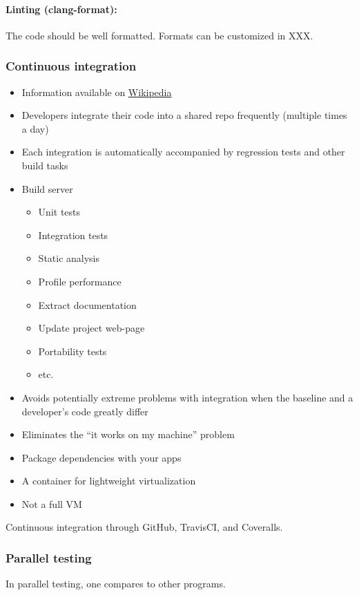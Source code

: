 \documentclass[12pt, titlepage]{article}
\begin{document}
\paragraph{Linting (clang-format):}
The code should be well formatted. Formats can be customized in XXX.

\subsubsection{Continuous integration}
\begin{itemize}
\item Information available on
  \href{https://en.wikipedia.org/wiki/Continuous_integration}{Wikipedia}
\item Developers integrate their code into a shared repo frequently (multiple
  times a day)
\item Each integration is automatically accompanied by regression tests and
  other build tasks
\item Build server
\begin{itemize}
\item Unit tests
\item Integration tests
\item Static analysis
\item Profile performance
\item Extract documentation
\item Update project web-page
\item Portability tests
\item etc.
\end{itemize}
\item Avoids potentially extreme problems with integration when the baseline and
  a developer's code greatly differ
\end{itemize}

\begin{itemize}
\item Eliminates the ``it works on my machine'' problem
\item Package dependencies with your apps
\item A container for lightweight virtualization
\item Not a full VM
\end{itemize}

Continuous integration through GitHub, TravisCI, and Coveralls.

\subsubsection{Parallel testing}
In parallel testing, one compares to other programs.
\end{document}
